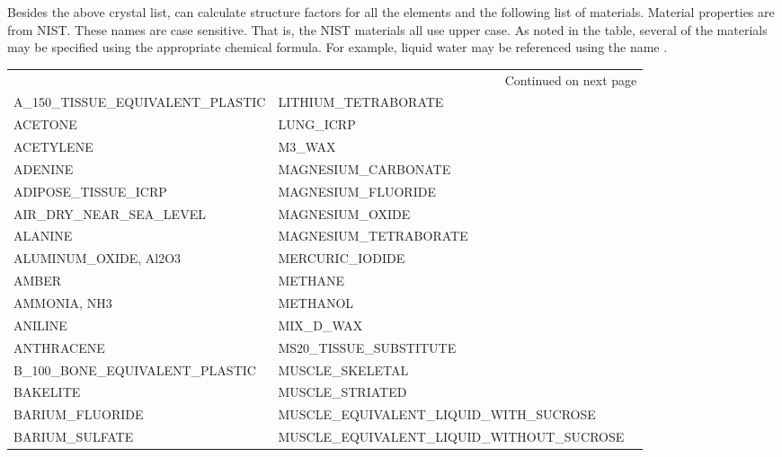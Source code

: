 Besides the above crystal list, \bmad can calculate structure factors for all the elements and the
following list of materials. Material properties are from NIST. These names are case sensitive. That
is, the NIST materials all use upper case. As noted in the table, several of the materials may be
specified using the appropriate chemical formula. For example, liquid water may be referenced using
the name .
\begin{center}
\footnotesize
\begin{longtable}{lll}
\multicolumn{3}{r}{{\normalsize Continued on next page}} \\
\endfoot
\endlastfoot
A_150_TISSUE_EQUIVALENT_PLASTIC     & LITHIUM_TETRABORATE                       \\
ACETONE                             & LUNG_ICRP                                 \\
ACETYLENE                           & M3_WAX                                    \\
ADENINE                             & MAGNESIUM_CARBONATE                       \\
ADIPOSE_TISSUE_ICRP                 & MAGNESIUM_FLUORIDE                        \\
AIR_DRY_NEAR_SEA_LEVEL              & MAGNESIUM_OXIDE                           \\
ALANINE                             & MAGNESIUM_TETRABORATE                     \\
ALUMINUM_OXIDE, Al2O3               & MERCURIC_IODIDE                           \\
AMBER                               & METHANE                                   \\
AMMONIA, NH3                        & METHANOL                                  \\
ANILINE                             & MIX_D_WAX                                 \\
ANTHRACENE                          & MS20_TISSUE_SUBSTITUTE                    \\
B_100_BONE_EQUIVALENT_PLASTIC       & MUSCLE_SKELETAL                           \\
BAKELITE                            & MUSCLE_STRIATED                           \\
BARIUM_FLUORIDE                     & MUSCLE_EQUIVALENT_LIQUID_WITH_SUCROSE     \\
BARIUM_SULFATE                      & MUSCLE_EQUIVALENT_LIQUID_WITHOUT_SUCROSE  \\

\end{longtable}
\end{center}
